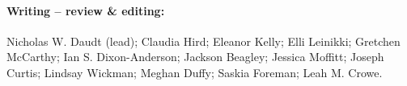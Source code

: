 \documentclass[10pt,letterpaper]{article}
\begin{document}
\paragraph*{Writing – review & editing:}  Nicholas W. Daudt (lead); Claudia Hird; Eleanor Kelly; Elli Leinikki; Gretchen McCarthy; Ian S. Dixon-Anderson; Jackson Beagley; Jessica Moffitt; Joseph Curtis; Lindsay Wickman; Meghan Duffy; Saskia Foreman; Leah M. Crowe.

\nolinenumbers

%
%
% 






\end{document}

